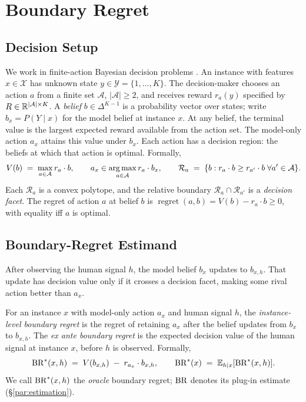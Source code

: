 \section{Boundary Regret}
\label{sec:methodology}

\subsection{Decision Setup}
We work in finite-action Bayesian decision problems \citep{DeGroot1970,Howard1966}.
An instance with features $x \in \mathcal{X}$ has unknown state $y \in \mathcal{Y} = \{1,\ldots,K\}$.
The decision-maker chooses an action $a$ from a finite set $\mathcal{A}$, $|\mathcal{A}| \geq 2$, and receives reward $r_a(y)$ specified by $R \in \mathbb{R}^{|\mathcal{A}| \times K}$.
A \emph{belief} $b \in \Delta^{K-1}$ is a probability vector over states; write $b_x = P(Y \mid x)$ for the model belief at instance $x$.
At any belief, the terminal value is the largest expected reward available from the action set.
The model-only action $a_x$ attains this value under $b_x$.
Each action has a decision region: the beliefs at which that action is optimal.
Formally,
\begin{equation}
    V(b) \;=\; \max_{a \in \mathcal{A}} r_a \cdot b,
    \qquad
    a_x \in \operatorname*{arg\,max}_{a \in \mathcal{A}} r_a \cdot b_x,
    \qquad
    \mathcal{R}_a
    \;=\;
    \{b : r_a \cdot b \geq r_{a'} \cdot b\;\forall a' \in \mathcal{A}\}.
\label{eq:decision-setup}
\end{equation}
Each $\mathcal{R}_a$ is a convex polytope, and the relative boundary $\mathcal{R}_a \cap \mathcal{R}_{a'}$ is a \emph{decision facet}.
The regret of action $a$ at belief $b$ is $\operatorname{regret}(a, b) = V(b) - r_a \cdot b \geq 0$, with equality iff $a$ is optimal.

\subsection{Boundary-Regret Estimand}
After observing the human signal $h$, the model belief $b_x$ updates to $b_{x,h}$.
That update has decision value only if it crosses a decision facet, making some rival action better than $a_x$.

\begin{definition}\label{def:br-instance}
For an instance $x$ with model-only action $a_x$ and human signal $h$, the \emph{instance-level boundary regret} is the regret of retaining $a_x$ after the belief updates from $b_x$ to $b_{x,h}$.
The \emph{ex ante boundary regret} is the expected decision value of the human signal at instance $x$, before $h$ is observed.
Formally,
\begin{equation}
    \operatorname{BR}^{*}(x, h) \;=\; V(b_{x,h}) \;-\; r_{a_x} \cdot b_{x,h},
    \qquad
    \operatorname{BR}^{*}(x) \;=\; \mathbb{E}_{h \mid x}[\operatorname{BR}^{*}(x, h)].
\label{eq:boundary-regret}
\end{equation}
We call $\operatorname{BR}^{*}(x,h)$ the \emph{oracle} boundary regret; $\operatorname{BR}$ denotes its plug-in estimate (\S\ref{par:estimation}).
\end{definition}

